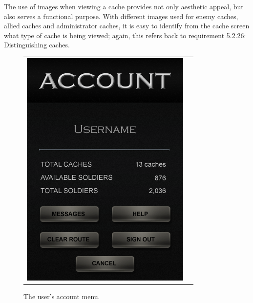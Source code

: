 The use of images when viewing a cache provides not only aesthetic appeal, but also serves a functional purpose. With different images used for enemy caches, allied caches and administrator caches, it is easy to identify from the cache screen what type of cache is being viewed; again, this refers back to requirement 5.2.26: Distinguishing caches.
\newpage
\vspace{-20pt}
\begin{figure}[h!]
\centering
\begin{tabular}{cc}
	\begin{minipage}{0.3\textwidth}
		\begin{center}
		\begin{minipage}{0.83\textwidth}
		\includegraphics[width=\textwidth]{images/account_mockup}
	\caption{The user's account menu.}
	\label{account}
		\end{minipage}
		\end{center}
	\end{minipage}
	

\end{tabular}
\end{figure}
